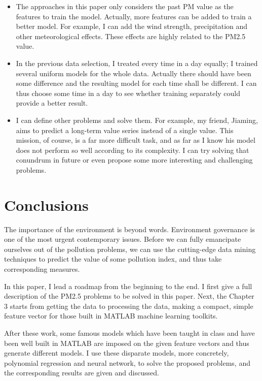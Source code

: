 \documentclass{sig-alternate}
\begin{document}
\begin{itemize}
    \item The approaches in this paper only considers the past PM value as the features to train the model. Actually, more features can be added to train a better model. For example, I can add the wind strength, precipitation and other meteorological effects. These effects are highly related to the PM2.5 value.
    \item In the previous data selection, I treated every time in a day equally; I trained several uniform models for the whole data. Actually there should have been some difference and the resulting model for each time shall be different. I can thus choose some time in a day to see whether training separately could provide a better result.
    \item I can define other problems and solve them. For example, my friend, Jiaming, aims to predict a long-term value series instead of a single value. This mission, of course, is a far more difficult task, and as far as I know his model does not perform so well according to its complexity. I can try solving that conundrum in future or even propose some more interesting and challenging problems.
\end{itemize}

\section{Conclusions}
The importance of the environment is beyond words. Environment governance is one of the most urgent contemporary issues. Before we can fully emancipate ourselves out of the pollution problems, we can use the cutting-edge data mining techniques to predict the value of some pollution index, and thus take corresponding measures.

In this paper, I lead a roadmap from the beginning to the end. I first give a full description of the PM2.5 problems to be solved in this paper. Next, the Chapter 3 starts from getting the data to processing the data, making a compact, simple feature vector for those built in MATLAB machine learning toolkits.

After these work, some famous models which have been taught in class and have been well built in MATLAB are imposed on the given feature vectors and thus generate different models. I use these disparate models, more concretely, polynomial regression and neural network, to solve the proposed problems, and the corresponding results are given and discussed.
\end{document}
